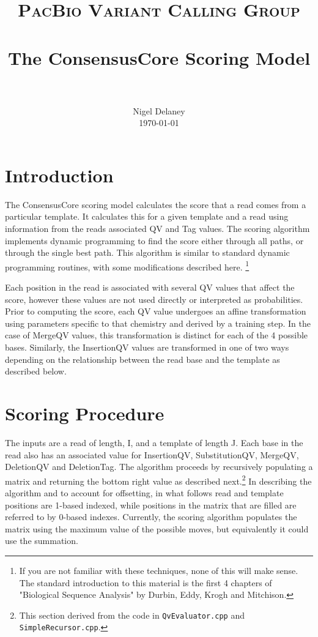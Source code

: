 \documentclass[paper=a4, fontsize=11pt]{scrartcl}
\title{
		\usefont{OT1}{bch}{b}{n}
		\normalfont \normalsize \textsc{PacBio Variant Calling Group} \\ [25pt]
		\horrule{0.5pt} \\[0.4cm]
		\huge The ConsensusCore Scoring Model \\
		\horrule{2pt} \\[0.5cm]
}
\author{
		\normalfont 								\normalsize
        Nigel Delaney\\[-3pt]		\normalsize
        \today
}
\date{}
\numberwithin{equation}{section}		%
\numberwithin{figure}{section}			%
\numberwithin{table}{section}				%
\begin{document}
\maketitle
\section{Introduction}

The ConsensusCore scoring model calculates the score that a read comes from a particular template.  It calculates this for a given template and a read using information from the reads associated QV and Tag values.  The scoring algorithm implements dynamic programming to find the score either through all paths, or through the single best path.  This algorithm is similar to standard dynamic programming routines, with some modifications described here. \footnote{If you are not familiar with these techniques, none of this will make sense.  The standard introduction to this material is the first 4 chapters of "Biological Sequence Analysis" by Durbin, Eddy, Krogh and Mitchison.}

Each position in the read is associated with several QV values that affect the score, however these values are not used directly or interpreted as probabilities.  Prior to computing the score, each QV value undergoes an affine transformation using parameters specific to that chemistry and derived by a training step.  In the case of MergeQV values, this transformation is distinct for each of the 4 possible bases. Similarly, the InsertionQV values are transformed in one of two ways depending on the relationship between the read base and the template as described below.
 




\section{ Scoring Procedure} 

The inputs are a read of length, I, and a template of length J.  Each base in the read also has an associated value for InsertionQV, SubstitutionQV, MergeQV, DeletionQV and DeletionTag.  The algorithm proceeds by recursively populating a matrix and returning the bottom right value as described next.\footnote{This section derived from the code in \texttt{QvEvaluator.cpp} and \texttt{SimpleRecursor.cpp}.}  In describing the algorithm and to account for offsetting, in what follows read and template positions are 1-based indexed, while positions in the matrix that are filled are referred to by 0-based indexes. Currently, the scoring algorithm populates the matrix using the maximum value of the possible moves, but equivalently it could use the summation.
\end{document}

